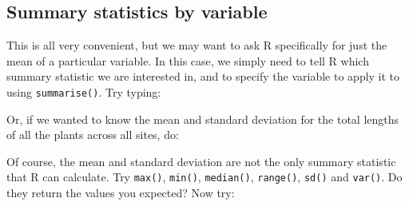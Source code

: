 \documentclass[]{book}
\newenvironment{Shaded}{\begin{snugshade}}{\end{snugshade}}
\newcommand{\KeywordTok}[1]{\textcolor[rgb]{0.13,0.29,0.53}{\textbf{#1}}}
\newcommand{\DataTypeTok}[1]{\textcolor[rgb]{0.13,0.29,0.53}{#1}}
\newcommand{\StringTok}[1]{\textcolor[rgb]{0.31,0.60,0.02}{#1}}
\newcommand{\CommentTok}[1]{\textcolor[rgb]{0.56,0.35,0.01}{\textit{#1}}}
\newcommand{\OperatorTok}[1]{\textcolor[rgb]{0.81,0.36,0.00}{\textbf{#1}}}
\newcommand{\NormalTok}[1]{#1}
\theoremstyle{definition}
\theoremstyle{definition}
\theoremstyle{definition}
\theoremstyle{remark}
\begin{document}
\subsection{Summary statistics by
variable}\label{summary-statistics-by-variable}

This is all very convenient, but we may want to ask R specifically for
just the mean of a particular variable. In this case, we simply need to
tell R which summary statistic we are interested in, and to specify the
variable to apply it to using \texttt{summarise()}. Try typing:

\begin{Shaded}
\end{Shaded}

Or, if we wanted to know the mean and standard deviation for the total
lengths of all the plants across all sites, do:

\begin{Shaded}
\end{Shaded}

Of course, the mean and standard deviation are not the only summary
statistic that R can calculate. Try \texttt{max()}, \texttt{min()},
\texttt{median()}, \texttt{range()}, \texttt{sd()} and \texttt{var()}.
Do they return the values you expected? Now try:

\begin{Shaded}
\end{Shaded}
\end{document}
